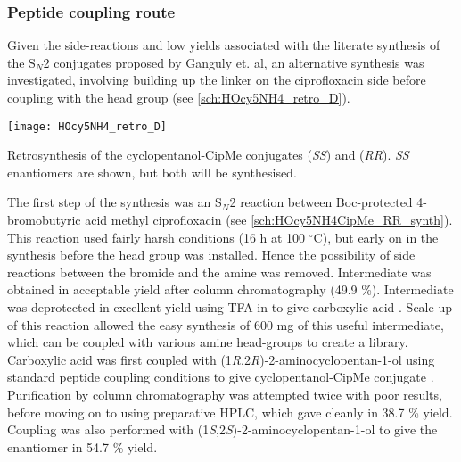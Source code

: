 \subsubsection{Peptide coupling route\label{sec:CipMe_linker}}

Given the side-reactions and low yields associated with the literate synthesis of the S$_N$2 conjugates proposed by Ganguly et. al\cite{Ganguly2011}, an alternative synthesis was investigated, involving building up the linker on the ciprofloxacin side before coupling with the head group (see \ref{sch:HOcy5NH4_retro_D}).


\begin{scheme}[H]
	\begin{center}
		\texttt{[image: HOcy5NH4\_retro\_D]}
		\caption{Retrosynthesis of the cyclopentanol-CipMe conjugates   (\textit{SS}) and  (\textit{RR}). \textit{SS} enantiomers are shown, but both will be synthesised.\label{sch:HOcy5NH4_retro_D}}
	\end{center}
\end{scheme}

The first step of the synthesis was an S$_N$2 reaction between Boc-protected 4-bromobutyric acid  methyl ciprofloxacin  (see \ref{sch:HOcy5NH4CipMe_RR_synth}). This reaction used fairly harsh conditions (16 h at 100 $^{\circ}$C), but early on in the synthesis before the head group was installed. Hence the possibility of side reactions between the bromide and the amine was removed. Intermediate  was obtained in acceptable yield after column chromatography (49.9 \%).
Intermediate  was deprotected in excellent yield using TFA in  to give carboxylic acid . Scale-up of this reaction allowed the easy synthesis of 600 mg of this useful intermediate, which can be coupled with various amine head-groups to create a library.
Carboxylic acid  was first coupled with (1\textit{R},2\textit{R})-2-aminocyclopentan-1-ol  using standard peptide coupling conditions to give cyclopentanol-CipMe conjugate . Purification by column chromatography was attempted twice with poor results, before moving on to using preparative HPLC, which gave  cleanly in 38.7 \% yield.
Coupling was also performed with (1\textit{S},2\textit{S})-2-aminocyclopentan-1-ol  to give the enantiomer  in 54.7 \% yield.

